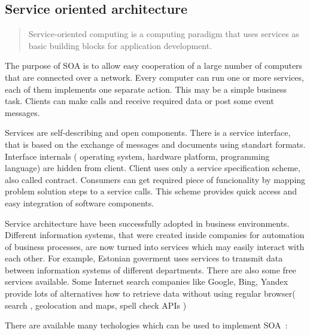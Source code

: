 \subsection{Service oriented architecture}
\begin{quote}
Service-oriented computing is a computing paradigm that uses services as basic building blocks for
application development.
\cite {lws_milanovic.pdf}
\end{quote} 

The purpose of \gls{SOA} is to allow easy cooperation of a large number of
computers that are connected over a network.
Every computer can run one or more services, each of them implements one
separate action. This may be a simple business task. Clients can make calls
and receive required data or post some event messages.

Services are self-describing and open components. There is a service interface,
that is based on the exchange of messages and documents using standart formats.
Interface internals ( operating system, hardware platform, programming language)
are hidden from client. Client uses only a service specification scheme, also
called contract. Consumers can get required piece of funcionality by mapping problem
solution steps to a service calls. This scheme provides quick access and easy integration of software components.


Service architecture have been successfully adopted in
business environments. Different information systems, that were created inside
companies for automation of business processes,  are now turned into services
which may easily interact with each other. For example, Estonian goverment uses
services to transmit data between information systems of different departments.
There are also some free services available. Some Internet search companies like
Google, Bing, Yandex provide lots of alternatives how to retrieve data without
using regular browser( search , geolocation and maps,  spell check \gls{API}s )

There are available many techologies which can be used to implement
\gls{SOA}~\cite{wikipedia:SOA}:

